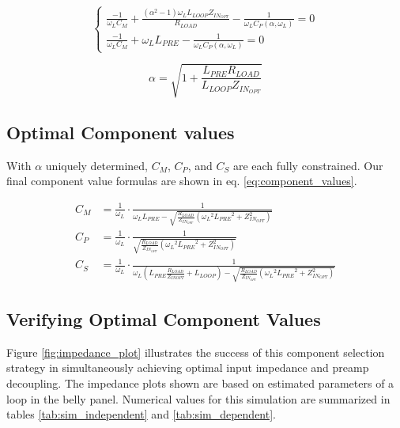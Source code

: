 \begin{equation}\label{eq:syseq}
\begin{cases}
    \frac{-1}{\omega_L C_M} + \frac{(\alpha^2-1) \omega_L L_{LOOP} Z_{IN_{OPT}}}{R_{LOAD}} - \frac{1}{\omega_L
    C_P(\alpha,\omega_L)} = 0\\

    \frac{-1}{\omega_L C_M} + \omega_L L_{PRE} - \frac{1}{\omega_L C_P(\alpha, \omega_L)} = 0 

\end{cases}
\end{equation}

\begin{equation}\label{eq:alpha}
    \alpha = \sqrt{1 + \frac{L_{PRE} R_{LOAD}}{L_{LOOP} Z_{IN_{OPT}}}}
\end{equation}

\subsection{Optimal Component values}
With $\alpha$ uniquely determined, $C_M$, $C_P$, and $C_S$ are each fully constrained. Our final component value formulas
are shown in eq. \ref{eq:component_values}.

\begin{equation}\label{eq:component_values}
\begin{aligned}
        C_M &= \frac{1}{\omega_L} \cdot \frac{1}{\omega_L L_{PRE} - \sqrt{\frac{R_{LOAD}}{Z_{IN_{OPT}}} ({\omega_L}^2 {L_{PRE}}^2 + Z_{IN_{OPT}}^2)}}\\
        C_P &= \frac{1}{\omega_L} \cdot \frac{1}{\sqrt{\frac{R_{LOAD}}{Z_{IN_{OPT}}} ({\omega_L}^2 {L_{PRE}}^2 + Z_{IN_{OPT}}^2)}}\\
        C_S &= \frac{1}{\omega_L} \cdot \frac{1}{\omega_L(L_{PRE} \frac{R_{LOAD}}{Z_{IN{OPT}}} + L_{LOOP}) - \sqrt{\frac{R_{LOAD}}{Z_{IN_{OPT}}} ({\omega_L}^2 {L_{PRE}}^2 + Z_{IN_{OPT}}^2)}}
\end{aligned}
\end{equation}

\subsection{Verifying Optimal Component Values}
Figure \ref{fig:impedance_plot} illustrates the success of this component selection strategy in simultaneously achieving
optimal input impedance and preamp decoupling. The impedance plots shown are based on estimated parameters of a loop in
the belly panel. Numerical values for this simulation are summarized in tables \ref{tab:sim_independent} and
\ref{tab:sim_dependent}.

